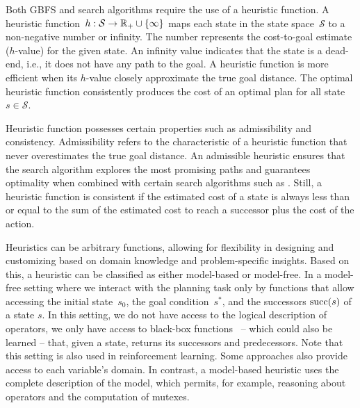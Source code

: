 
Both GBFS and \astar search algorithms require the use of a heuristic function. A heuristic function~$h:\mathcal{S}\rightarrow\mathbb{R}_{+}\cup\{\infty\}$ maps each state in the state space~$\mathcal{S}$ to a non-negative number or infinity. The number represents the cost-to-goal estimate ($h$-value) for the given state. An infinity value indicates that the state is a dead-end, i.e., it does not have any path to the goal. A heuristic function is more efficient when its $h$-value closely approximate the true goal distance. The optimal heuristic function \hstar consistently produces the cost of an optimal plan for all state~$s \in \mathcal{S}$.

Heuristic function possesses certain properties such as admissibility and consistency. Admissibility refers to the characteristic of a heuristic function that never overestimates the true goal distance. An admissible heuristic ensures that the search algorithm explores the most promising paths and guarantees optimality when combined with certain search algorithms such as \astar. Still, a heuristic function is consistent if the estimated cost of a state is always less than or equal to the sum of the estimated cost to reach a successor plus the cost of the action.

Heuristics can be arbitrary functions, allowing for flexibility in designing and customizing based on domain knowledge and problem-specific insights. Based on this, a heuristic can be classified as either model-based or model-free. In a model-free setting where we interact with the planning task only by functions that allow accessing the initial state~$s_0$, the goal condition~$s^*$, and the successors $\operatorname{succ}(s)$ of a state $s$. In this setting, we do not have access to the logical description of operators, we only have access to black-box functions~\cite{Sturtevant2019} -- which could also be learned -- that, given a state, returns its successors and predecessors. Note that this setting is also used in reinforcement learning. Some approaches also provide access to each variable's domain. In contrast, a model-based heuristic uses the complete description of the model, which permits, for example, reasoning about operators and the computation of mutexes.

